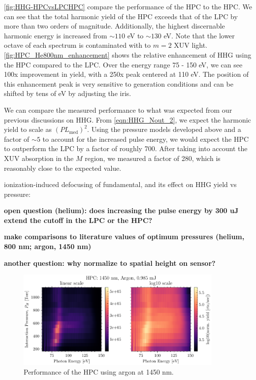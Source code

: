 \cref{fig:HHG-HPCvsLPCHPC} compare the performance of the HPC to the HPC. We can see that the total harmonic yield of the HPC exceeds that of the LPC by more than two orders of magnitude. Additionally, the highest discernable harmonic energy is increased from $\sim 110$ eV to $\sim 130$ eV. Note that the lower octave of each spectrum is contaminated with to $m=2$ XUV light. \cref{fig:HPC_He800nm_enhancement} shows the relative enhancement of HHG using the HPC compared to the LPC. Over the energy range 75 - 150 eV, we can see 100x improvement in yield, with a 250x peak centered at 110 eV. The position of this enhancement peak is very sensitive to generation conditions and can be shifted by tens of eV by adjusting the iris.

We can compare the measured performance to what was expected from our previous discussions on HHG. From \cref{eqn:HHG_Nout_2}, we expect the harmonic yield to scale as $(PL_{\textrm{med}})^2$. Using the pressure models developed above and a factor of $\sim 5$ to account for the increased pulse energy, we would expect the HPC to outperform the LPC by a factor of roughly 700. After taking into account the XUV absorption in the $M$ region, we measured a factor of 280, which is reasonably close to the expected value. 

ionization-induced defocusing of fundamental, and its effect on HHG yield vs pressure: \cite{altucciInfluenceAtomicDensity1996}

\textbf{open question (helium): does increasing the pulse energy by 300 uJ extend the cutoff in the LPC or the HPC?}

\textbf{make comparisons to literature values of optimum pressures (helium, 800 nm; argon, 1450 nm)}

\textbf{another question: why normalize to spatial height on sensor?}


\begin{figure}
	\centering
	\includegraphics[width=0.9\textwidth]{figures/chap3/HPC_1450nm_Ar_spectrogram.pdf}
	\caption{Performance of the HPC using argon at 1450 nm.}
	\label{fig:HPC_1450nm_Ar_spectrogram}
\end{figure}

